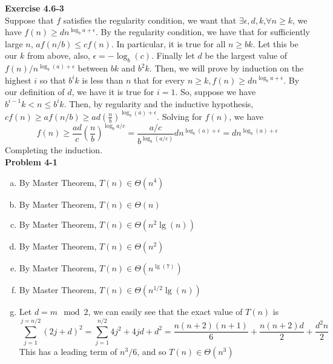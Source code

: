 \documentclass{article}
\begin{document}
\noindent\textbf{Exercise 4.6-3}\\

Suppose that $f$ satisfies the regularity condition, we want that $\exists \epsilon, d,k$,$\forall n\ge k$, we have $f(n) \ge d n^{\log_b a +\epsilon}$. By the regularity condition, we have that for sufficiently large $n$, $af(n/b) \le cf(n)$. In particular, it is true for all $n\ge bk$. Let this be our $k$ from above, also, $\epsilon= -\log_b(c)$. Finally let $d$ be the largest value of $f(n)/n^{\log_b(a)+\epsilon}$ between $bk$ and $b^2k$. Then, we will prove by induction on the highest $i$ so that $b^i k$ is less than $n$ that for every $n\ge k, f(n) \ge d n^{\log_b a +\epsilon}$. By our definition of $d$, we have it is true for $i= 1$. So, suppose we have $b^{i-1}k < n \le b^i k$. Then, by regularity and the inductive hypothesis,  $cf(n) \ge a f(n/b) \ge ad \left(\frac{n}{b}\right)^{\log_b(a) +\epsilon}$. Solving for $f(n)$, we have
\[
f(n) \ge \frac{ad}{c} \left(\frac{n}{b}\right)^{\log_b{a/c}} = \frac{a/c}{b^{\log_b(a/c)}} d n^{\log_b(a) + \epsilon} =  d n^{\log_b(a) + \epsilon}
\]
Completing the induction. \\



\noindent\textbf{Problem 4-1}\\

\begin{enumerate}[a)]
\item
By Master Theorem, $T(n) \in \Theta(n^4)$

\item
By Master Theorem, $T(n) \in \Theta(n)$

\item
By Master Theorem, $T(n) \in \Theta(n^2\lg(n))$

\item
By Master Theorem, $T(n) \in \Theta(n^2)$

\item
By Master Theorem, $T(n) \in \Theta(n^{\lg(7)})$

\item
By Master Theorem, $T(n) \in \Theta(n^{1/2}\lg(n))$

\item
Let $d = m\mod 2$, we can easily see that the exact value of $T(n)$ is
\[
\sum_{j=1}^{j=n/2} (2j+d)^2 = \sum_{j=1}^{n/2}4j^2 + 4jd + d^2 = \frac{n(n+2)(n+1)}{6} + \frac{n(n+2)d}{2} + \frac{d^2n}{2}
\]
This has a leading term of $n^3/6$, and so $T(n) \in \Theta(n^3)$

\end{enumerate}
\end{document}
